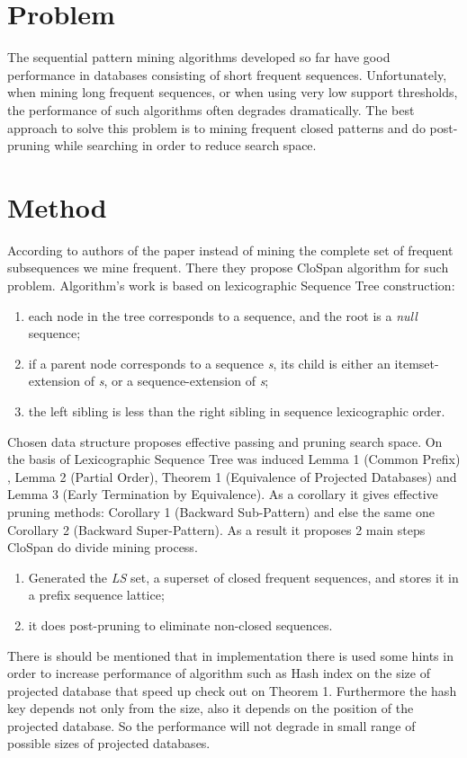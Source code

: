 \documentclass[journal]{IEEEtran}
\begin{document}
\section{Problem}
The sequential pattern mining algorithms developed so far have good performance in databases consisting of short frequent sequences. Unfortunately, when mining long frequent sequences, or when using very low support thresholds, the performance of such algorithms often degrades dramatically. The best approach to solve this problem is to mining frequent closed patterns and do post-pruning while searching in order to reduce search space.

\section{Method}
According to authors of the paper \cite{CloSpan} instead of mining the complete set of frequent subsequences we mine frequent. There they propose CloSpan algorithm for such problem. Algorithm's work is based on lexicographic Sequence Tree construction:
\begin{enumerate}
\item each node in the tree corresponds to a sequence, and the root is a {\it null} sequence;
\item if a parent node corresponds to a sequence {\it s}, its child is either an itemset-extension of {\it s}, or a sequence-extension of {\it s};
\item the left sibling is less than the right sibling in sequence lexicographic order.
\end{enumerate}
Chosen data structure proposes effective passing and pruning search space. On the basis of Lexicographic Sequence Tree was induced Lemma 1 (Common Prefix) , Lemma 2 (Partial Order), Theorem 1 (Equivalence of Projected Databases) and Lemma 3 (Early Termination by Equivalence). As a corollary it gives effective pruning methods: Corollary 1 (Backward Sub-Pattern) and else the same one Corollary 2 (Backward Super-Pattern). As a result it proposes 2 main steps CloSpan do divide mining process.
\begin{enumerate}
\item Generated the {\it LS} set, a superset of closed frequent sequences, and stores it in a prefix sequence lattice;
\item it does post-pruning to eliminate non-closed sequences.
\end{enumerate}
There is should be mentioned that in implementation there is used some hints in order to increase performance of algorithm such as Hash index on the size of projected database that speed up check out on Theorem 1. Furthermore the hash key depends not only from the size, also it depends on the position of the projected database. So the performance will not degrade  in small range of possible sizes of projected databases.
\end{document}
